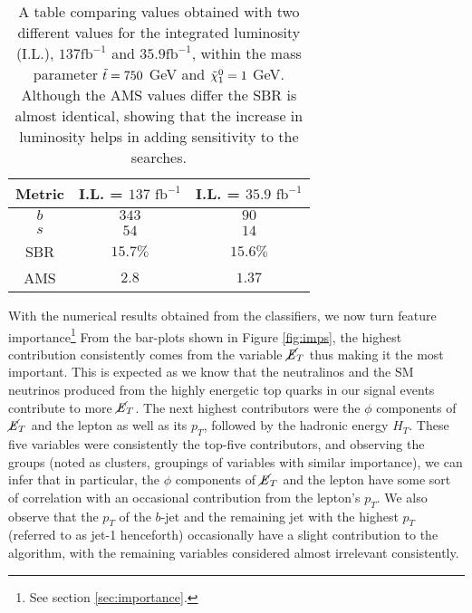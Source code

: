 \begin{table}[htbp]
    \centering
    \begin{tabular}{c||c|c}
        \toprule
        Metric & I.L. = $137\text{ fb}^{-1}$ & I.L. = $35.9\text{ fb}^{-1}$ \\
        \midrule
        \rowcolor{gray!6} $b$ & $343$ & $90$ \\
        $s$ & $54$ & $14$\\
        \rowcolor{gray!6} SBR & $15.7\%$ & $15.6\%$\\
        AMS & $2.8$ & $1.37$ \\
        \bottomrule
    \end{tabular}
    \caption{A table comparing values obtained with two different values for the integrated luminosity (I.L.), $137\text{fb}^{-1}$ and $35.9\text{fb}^{-1}$, within the mass parameter $\Tilde{t} = 750$ GeV and $\Tilde{\chi}_1^0 = 1$ GeV. Although the AMS values differ the SBR is almost identical, showing that the increase in luminosity helps in adding sensitivity to the searches.}
    \label{tab:valsComp}
\end{table}


With the numerical results obtained from the classifiers, we now turn feature importance\footnote{See section \ref{sec:importance}.} From the bar-plots shown in Figure \ref{fig:imps}, the highest contribution consistently comes from the variable $\cancel{\it{E}}_{T}$ thus making it the most important. This is expected as we know that the neutralinos and the SM neutrinos produced from the highly energetic top quarks in our signal events contribute to more $\cancel{\it{E}}_{T}$. The next highest contributors were the $\phi$ components of $\cancel{\it{E}}_{T}$ and the lepton as well as its $p_T$, followed by the hadronic energy $H_T$. These five variables were consistently the top-five contributors, and observing the groups (noted as clusters, groupings of variables with similar importance), we can infer that in particular, the $\phi$ components of $\cancel{\it{E}}_{T}$ and the lepton have some sort of correlation with an occasional contribution from the lepton's $p_T$. We also observe that the $p_T$ of the $b$-jet and the remaining jet with the highest $p_T$ (referred to as jet-1 henceforth) occasionally have a slight contribution to the algorithm, with the remaining variables considered almost irrelevant consistently.


